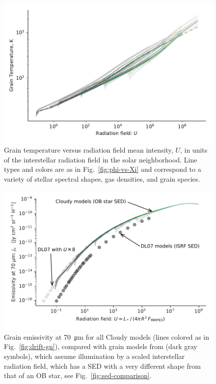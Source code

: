 \begin{figure}
  \centering
  \includegraphics[width=\linewidth]{figs/grain-T-vs-U}
  \caption{Grain temperature versus radiation field mean intensity,
    \(U\), in units of the interstellar radiation field in the solar
    neighborhood.  Line types and colors are as in
    Fig.~\ref{fig:phi-vs-Xi} and correspond to a variety of stellar
    spectral shapes, gas densities, and grain species.}
  \label{fig:grain-T-vs-U}
\end{figure}


\begin{figure}
  \centering
  \includegraphics[width=\linewidth]{figs/grain-j70-vs-U-edited}
  \caption{Grain emissivity at \SI{70}{\um} for all Cloudy models
    (lines colored as in Fig.~\ref{fig:drift-gn}), compared with grain
    models from \citet{Draine:2007a} (dark gray symbols), which assume
    illumination by a scaled interstellar radiation field, which has a
    SED with a very different shape from that of an OB star, see
    Fig.~\ref{fig:sed-comparison}.  }
  \label{fig:grain-j70}
\end{figure}

